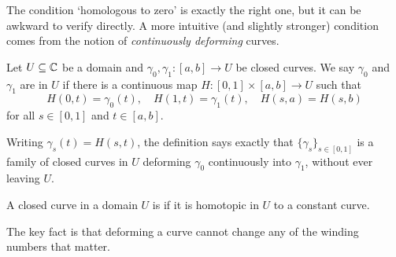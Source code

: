\documentclass[a4paper]{scrartcl}
\begin{document}
The condition `homologous to zero' is exactly the right one, but it can be awkward to verify directly. A more intuitive (and slightly stronger) condition comes from the notion of \emph{continuously deforming} curves.

\begin{definition}[Homotopy]
    Let $U \subseteq \mathbb{C}$ be a domain and $\gamma_0, \gamma_1: [a, b] \rightarrow U$ be closed curves. We say $\gamma_0$ and $\gamma_1$ are  in $U$ if there is a continuous map $H: [0, 1] \times [a, b] \rightarrow U$ such that
    $$
    H(0, t) = \gamma_0(t), \quad H(1, t) = \gamma_1(t), \quad H(s, a) = H(s, b)
    $$
    for all $s \in [0, 1]$ and $t \in [a, b]$.
\end{definition}

Writing $\gamma_s(t) = H(s, t)$, the definition says exactly that $\{\gamma_s\}_{s \in [0,1]}$ is a family of closed curves in $U$ deforming $\gamma_0$ continuously into $\gamma_1$, without ever leaving $U$.

\begin{center}
\end{center}

\begin{definition}
    A closed curve in a domain $U$ is  if it is homotopic in $U$ to a constant curve.
\end{definition}

The key fact is that deforming a curve cannot change any of the winding numbers that matter.
\end{document}
